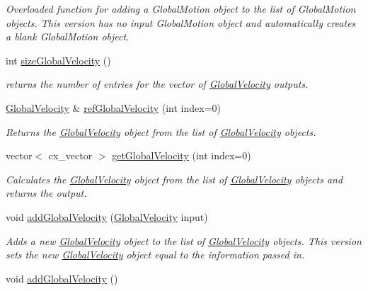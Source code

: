 \begin{DoxyCompactItemize}
\begin{DoxyCompactList}\small\item\em Overloaded function for adding a Global\-Motion object to the list of Global\-Motion objects. This version has no input Global\-Motion object and automatically creates a blank Global\-Motion object. \end{DoxyCompactList}\item 
int \hyperlink{class_outputs_body_af41b4423bd40c87fa87ae0af53bc96e5}{size\-Global\-Velocity} ()
\begin{DoxyCompactList}\small\item\em returns the number of entries for the vector of \hyperlink{class_global_velocity}{Global\-Velocity} outputs. \end{DoxyCompactList}\item 
\hyperlink{class_global_velocity}{Global\-Velocity} \& \hyperlink{class_outputs_body_a6728d42493b83db7d682ca751a8f080a}{ref\-Global\-Velocity} (int index=0)
\begin{DoxyCompactList}\small\item\em Returns the \hyperlink{class_global_velocity}{Global\-Velocity} object from the list of \hyperlink{class_global_velocity}{Global\-Velocity} objects. \end{DoxyCompactList}\item 
vector$<$ cx\-\_\-vector $>$ \hyperlink{class_outputs_body_a16d63ba2343caa9244a461fb3d539843}{get\-Global\-Velocity} (int index=0)
\begin{DoxyCompactList}\small\item\em Calculates the \hyperlink{class_global_velocity}{Global\-Velocity} object from the list of \hyperlink{class_global_velocity}{Global\-Velocity} objects and returns the output. \end{DoxyCompactList}\item 
void \hyperlink{class_outputs_body_abe974976080b1b9bfa3d66ffb89b0640}{add\-Global\-Velocity} (\hyperlink{class_global_velocity}{Global\-Velocity} input)
\begin{DoxyCompactList}\small\item\em Adds a new \hyperlink{class_global_velocity}{Global\-Velocity} object to the list of \hyperlink{class_global_velocity}{Global\-Velocity} objects. This version sets the new \hyperlink{class_global_velocity}{Global\-Velocity} object equal to the information passed in. \end{DoxyCompactList}\item 
\hypertarget{class_outputs_body_a07a548f3df9fa5aff4223a60f5f1b56c}{void \hyperlink{class_outputs_body_a07a548f3df9fa5aff4223a60f5f1b56c}{add\-Global\-Velocity} ()}\label{class_outputs_body_a07a548f3df9fa5aff4223a60f5f1b56c}


\end{DoxyCompactItemize}
